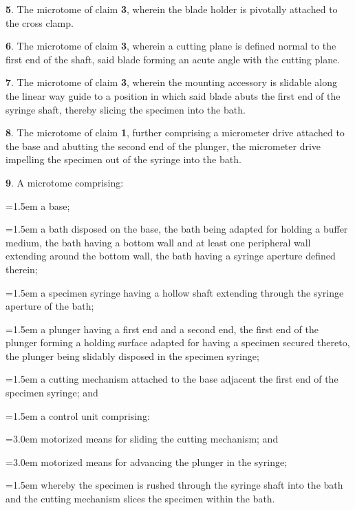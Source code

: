 \documentclass{article}
\begin{document}
\begin{hangpars}
\textbf{5}. The microtome of claim \textbf{3}, wherein the blade holder is pivotally attached to the cross clamp.

\textbf{6}. The microtome of claim \textbf{3}, wherein a cutting plane is defined normal to the first end of the shaft, said blade forming an acute angle with the cutting plane.

\textbf{7}. The microtome of claim \textbf{3}, wherein the mounting accessory is slidable along the linear way guide to a position in which said blade abuts the first end of the syringe shaft, thereby slicing the specimen into the bath.

\textbf{8}. The microtome of claim \textbf{1}, further comprising a micrometer drive attached to the base and abutting the second end of the plunger, the micrometer drive impelling the specimen out of the syringe into the bath.

\textbf{9}. A microtome comprising:

{\leftskip=1.5em\parindent=0pt a base;\par}
{\leftskip=1.5em\parindent=0pt a bath disposed on the base, the bath being adapted for holding a buffer medium, the bath having a bottom wall and at least one peripheral wall extending around the bottom wall, the bath having a syringe aperture defined therein;\par}
{\leftskip=1.5em\parindent=0pt a specimen syringe having a hollow shaft extending through the syringe aperture of the bath;\par}
{\leftskip=1.5em\parindent=0pt a plunger having a first end and a second end, the first end of the plunger forming a holding surface adapted for having a specimen secured thereto, the plunger being slidably disposed in the specimen syringe;\par}
{\leftskip=1.5em\parindent=0pt a cutting mechanism attached to the base adjacent the first end of the specimen syringe; and\par}
{\leftskip=1.5em\parindent=0pt a control unit comprising:\par}
{\leftskip=3.0em\parindent=0pt motorized means for sliding the cutting mechanism; and\par}
{\leftskip=3.0em\parindent=0pt motorized means for advancing the plunger in the syringe;\par}
{\leftskip=1.5em\parindent=0pt whereby the specimen is rushed through the syringe shaft into the bath and the cutting mechanism slices the specimen within the bath.\par}


\end{hangpars}
\end{document}

